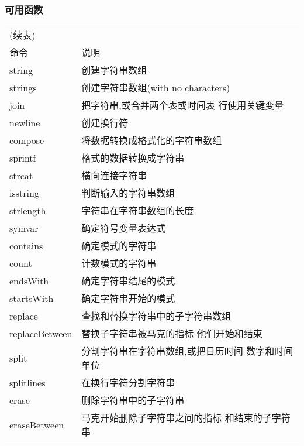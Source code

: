         \subsubsection{可用函数}
            \begin{longtable}{|l|l|}
            \hline
            \endfirsthead
            \multicolumn{2}{l}{(续表)}
            \endhead
            \hline
            \multicolumn{2}{c}{\itshape 接下页表格……}\\
            \endfoot
            \hline
            \endlastfoot
            \hline
            命令 & 说明 \\
            \hline
            string & 创建字符串数组\\\hline
            strings  & 创建字符串数组(with no characters)\\\hline
            join & 把字符串,或合并两个表或时间表 行使用关键变量\\\hline
            newline  & 创建换行符\\\hline
            compose  & 将数据转换成格式化的字符串数组\\\hline
            sprintf  & 格式的数据转换成字符串\\\hline
            strcat & 横向连接字符串\\\hline
            isstring & 判断输入的字符串数组\\\hline
            strlength  & 字符串在字符串数组的长度\\\hline
            symvar & 确定符号变量表达式\\\hline
            contains & 确定模式的字符串\\\hline
            count  & 计数模式的字符串\\\hline
            endsWith & 确定字符串结尾的模式\\\hline
            startsWith & 确定字符串开始的模式\\\hline
            replace  & 查找和替换字符串中的子字符串数组\\\hline
            replaceBetween & 替换子字符串被马克的指标 他们开始和结束\\\hline
            split &  分割字符串在字符串数组,或把日历时间 数字和时间单位\\\hline
            splitlines & 在换行字符分割字符串\\\hline
            erase &  删除字符串中的子字符串\\\hline
            eraseBetween & 马克开始删除子字符串之间的指标 和结束的子字符串\\\hline

\end{longtable}
